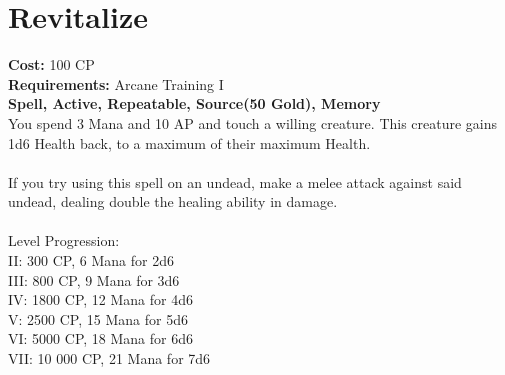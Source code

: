 \section{Revitalize}
\textbf{Cost:} 100 CP\\
\textbf{Requirements:}  Arcane Training I\\
\textbf{Spell, Active, Repeatable, Source(50 Gold), Memory}\\
You spend 3 Mana and 10 AP and touch a willing creature. This creature gains 1d6 Health back, to a maximum of their maximum Health.\\
\\
If you try using this spell on an undead, make a melee attack against said undead, dealing double the healing ability in damage.\\
\\
Level Progression:\\
II: 300 CP, 6 Mana for 2d6\\
III: 800 CP, 9 Mana for 3d6\\
IV: 1800 CP, 12 Mana for 4d6\\
V: 2500 CP, 15 Mana for 5d6\\
VI: 5000 CP, 18 Mana for 6d6\\
VII: 10 000 CP, 21 Mana for 7d6\\